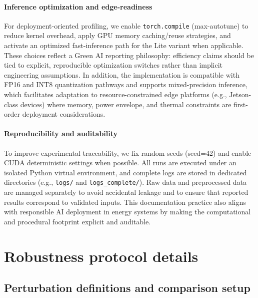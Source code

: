 \documentclass[review,3p,times]{elsarticle}
\begin{document}
\paragraph{Inference optimization and edge-readiness}
For deployment-oriented profiling, we enable \texttt{torch.compile} (max-autotune) to reduce kernel overhead, apply GPU memory caching/reuse strategies, and activate an optimized fast-inference path for the Lite variant when applicable. These choices reflect a Green AI reporting philosophy: efficiency claims should be tied to explicit, reproducible optimization switches rather than implicit engineering assumptions. In addition, the implementation is compatible with FP16 and INT8 quantization pathways and supports mixed-precision inference, which facilitates adaptation to resource-constrained edge platforms (e.g., Jetson-class devices) where memory, power envelope, and thermal constraints are first-order deployment considerations.

\paragraph{Reproducibility and auditability}
To improve experimental traceability, we fix random seeds (seed=42) and enable CUDA deterministic settings when possible. All runs are executed under an isolated Python virtual environment, and complete logs are stored in dedicated directories (e.g., \texttt{logs/} and \texttt{logs\_complete/}). Raw data and preprocessed data are managed separately to avoid accidental leakage and to ensure that reported results correspond to validated inputs. This documentation practice also aligns with responsible AI deployment in energy systems by making the computational and procedural footprint explicit and auditable.

\section{Robustness protocol details}\label{app:robust_details}
\subsection{Perturbation definitions and comparison setup}
\end{document}
